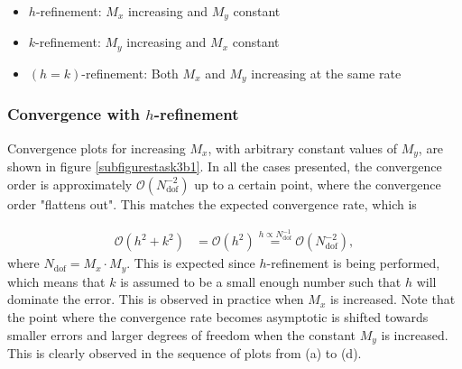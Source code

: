 \begin{itemize}
    \item $h$-refinement: $M_x$ increasing and $M_y$ constant
    \item $k$-refinement: $M_y$ increasing and $M_x$ constant
    \item $(h = k)$-refinement: Both $M_x$ and $M_y$ increasing at the same rate
\end{itemize}

\subsubsection*{Convergence with $h$-refinement}
Convergence plots for increasing $M_x$, with arbitrary constant values of $M_y$, are shown in figure \ref{subfigurestask3b1}. In all the cases presented, the convergence order is approximately $\mathcal{O}(N_{\mathrm{dof}}^{-2})$ up to a certain point, where the convergence order "flattens out". This matches the expected convergence rate, which is 

\begin{equation*}
\begin{split}
    \mathcal{O}(h^2 + k^2) &= \mathcal{O}(h^2) \overset{h \propto N_{\mathrm{dof}}^{-1}}= \mathcal{O}(N_{\mathrm{dof}}^{-2}), 
\end{split}
\end{equation*}
where $N_{\mathrm{dof}} = M_x\cdot M_y$. This is expected since $h$-refinement is being performed, which means that $k$ is assumed to be a small enough number such that $h$ will dominate the error. This is observed in practice when $M_x$ is increased. Note that the point where the convergence rate becomes asymptotic is shifted towards smaller errors and larger degrees of freedom when the constant $M_y$ is increased. This is clearly observed in the sequence of plots from (a) to (d). 

